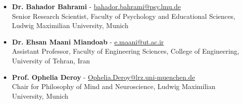 \documentclass[a4paper,12pt]{article}
\begin{document}
\begin{itemize}
    \item \textbf{Dr. Bahador Bahrami} - \href{mailto:bahador.bahrami@psy.lmu.de}{bahador.bahrami@psy.lmu.de}\\
    Senior Research Scientist, Faculty of Psychology and Educational Sciences, Ludwig Maximilian University, Munich
    
    \item \textbf{Dr. Ehsan Maani Miandoab} - \href{mailto:e.maani@ut.ac.ir}{e.maani@ut.ac.ir}\\
    Assistant Professor, Faculty of Engineering Sciences, College of Engineering, University of Tehran, Iran
    
    \item \textbf{Prof. Ophelia Deroy} - \href{mailto:Ophelia.Deroy@lrz.uni-muenchen.de}{Ophelia.Deroy@lrz.uni-muenchen.de}\\
    Chair for Philosophy of Mind and Neuroscience, Ludwig Maximilian University, Munich
\end{itemize}
\end{document}
